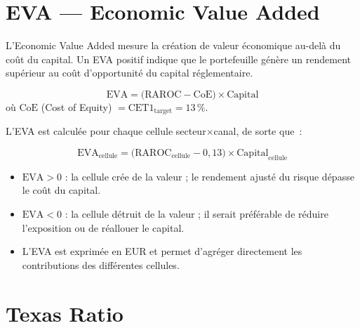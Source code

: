 \documentclass[12pt,a4paper]{article}
\begin{document}
\section{EVA --- Economic Value Added}
\label{sec:eva}

\begin{definitionbox}
L'Economic Value Added mesure la cr\'eation de valeur \'economique au-del\`a du co\^ut du capital. Un EVA positif indique que le portefeuille g\'en\`ere un rendement sup\'erieur au co\^ut d'opportunit\'e du capital r\'eglementaire.
\end{definitionbox}

\begin{formulebox}[EVA]
\begin{equation}
    \text{EVA} = \bigl(\text{RAROC} - \text{CoE}\bigr) \times \text{Capital}
    \label{eq:eva}
\end{equation}
o\`u $\text{CoE}$ (Cost of Equity) $= \text{CET1}_{\text{target}} = 13\,\%$.
\end{formulebox}

L'EVA est calcul\'ee pour chaque cellule secteur$\times$canal, de sorte que~:

\begin{equation}
    \text{EVA}_{\text{cellule}} = \bigl(\text{RAROC}_{\text{cellule}} - 0{,}13\bigr) \times \text{Capital}_{\text{cellule}}
    \label{eq:eva_cell}
\end{equation}

\begin{interpretbox}
\begin{itemize}[nosep]
    \item $\text{EVA} > 0$ : la cellule cr\'ee de la valeur ; le rendement ajust\'e du risque d\'epasse le co\^ut du capital.
    \item $\text{EVA} < 0$ : la cellule d\'etruit de la valeur ; il serait pr\'ef\'erable de r\'eduire l'exposition ou de r\'eallouer le capital.
    \item L'EVA est exprim\'ee en EUR et permet d'agr\'eger directement les contributions des diff\'erentes cellules.
\end{itemize}
\end{interpretbox}

\section{Texas Ratio}
\label{sec:texas}
\end{document}
